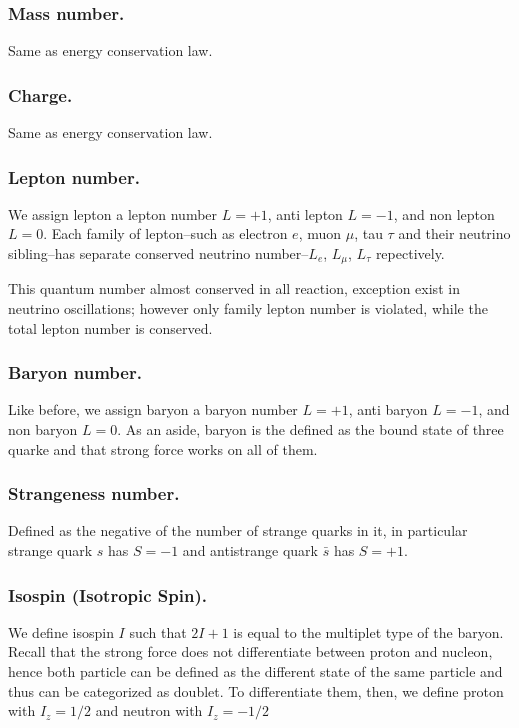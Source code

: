\documentclass[../../../main.tex]{subfiles}
\begin{document}
\subsubsection*{Mass number.} Same as energy conservation law.

\subsubsection*{Charge.} Same as energy conservation law.

\subsubsection*{Lepton number.} We assign lepton a lepton number $L=+1$, anti lepton $L=-1$, and non lepton $L=0$. Each family of lepton--such as electron $e$, muon $\mu$, tau $\tau$ and their neutrino sibling--has separate conserved neutrino number--$L_e$, $L_\mu$, $L_\tau$ repectively.

This quantum number almost conserved in all reaction, exception exist in neutrino oscillations; however only family lepton number is violated, while the total lepton number is conserved.

\subsubsection*{Baryon number.} Like before, we assign baryon a baryon number $L=+1$, anti baryon $L=-1$, and non baryon $L=0$. As an aside, baryon is the defined as the bound state of three quarke and that strong force works on all of them.

\subsubsection*{Strangeness number.} Defined as the negative of the number of strange quarks in it, in particular strange quark $s$ has $S=-1$ and antistrange quark $\bar{s}$ has $S=+1$.

\subsubsection*{Isospin (Isotropic Spin).} We define isospin $I$ such that $2I+1$ is equal to the multiplet type of the baryon. Recall that the strong force does not differentiate between proton and nucleon, hence both particle can be defined as the different state of the same particle and thus can be categorized as doublet. To differentiate them, then, we define proton with $I_z=1/2$ and neutron with $I_z=-1/2$
\end{document}
